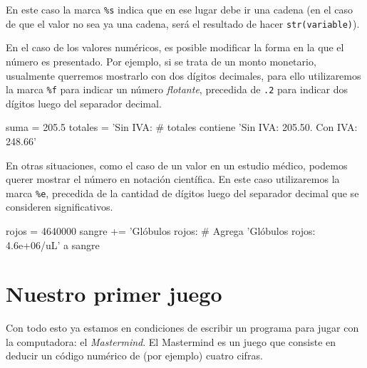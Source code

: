 En este caso la marca \lstinline!%s! indica que en ese lugar debe ir una cadena
(en el caso de que el valor no sea ya una cadena, será el resultado de hacer
\lstinline!str(variable)!).

En el caso de los valores numéricos, es posible modificar la forma en la que el
número es presentado. Por ejemplo, si se trata de un monto monetario, usualmente
querremos mostrarlo con dos dígitos decimales, para ello utilizaremos la
marca \lstinline!%f! para indicar un número {\it flotante}, precedida de
\lstinline!.2! para indicar dos dígitos luego del separador decimal.

\begin{codigo-python-sn}
suma = 205.5
totales = 'Sin IVA: %
# totales contiene 'Sin IVA: 205.50. Con IVA: 248.66'
\end{codigo-python-sn}

En otras situaciones, como el caso de un valor en un estudio médico, podemos
querer mostrar el número en notación científica. En este caso utilizaremos la
marca \lstinline!%e!, precedida de la cantidad de dígitos luego del separador
decimal que se consideren significativos.

\begin{codigo-python-sn}
rojos = 4640000
sangre += 'Glóbulos rojos: %
# Agrega 'Glóbulos rojos: 4.6e+06/uL\n' a sangre
\end{codigo-python-sn}

\section{Nuestro primer juego}
Con todo esto ya estamos en condiciones de escribir un programa para jugar con
la computadora: el {\it Mastermind}. El Mastermind es un juego que consiste en
deducir un código numérico de (por ejemplo) cuatro cifras.

